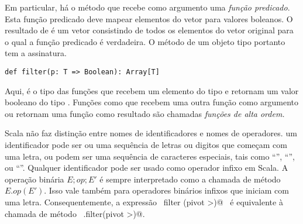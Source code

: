 Em particular, há o método  que recebe como argumento uma
{\em função predicado}. Esta função predicado deve mapear elementos do 
vetor para valores boleanos. O resultado de  é um vetor
consistindo de todos os elementos do vetor original para o qual a função
predicado é verdadeira. O método  de um objeto tipo
 portanto tem a assinatura. 


\begin{lstlisting}
def filter(p: T => Boolean): Array[T]
\end{lstlisting}

Aqui,  é o tipo das funções que recebem um elemento 
do tipo  e retornam um valor booleano do tipo . 
Funções como  
que recebem uma outra função como argumento ou retornam uma função como
resultado são chamadas {\em funções de alta ordem.}     

Scala não faz distinção entre nomes de identificadores e nomes de operadores.
um identificador pode ser ou uma sequência de letras ou digitos que começam
com uma letra, ou podem ser uma sequência de caracteres especiais, tais como 
``\code{+}'', ``\code{*}'', ou ``\code{:}''.  Qualquer identificador pode
ser usado como operador infixo em Scala. A operação binária $E;op;E'$ é sempre
interpretado como a chamada de método $E.op(E')$. Isso vale também para 
operadores binários infixos que iniciam com uma letra. Consequentemente,
a expressão  ~\lstinline@xs filter (pivot >)@~ é equivalente à chamada de
método ~\lstinline@xs.filter(pivot >)@.



